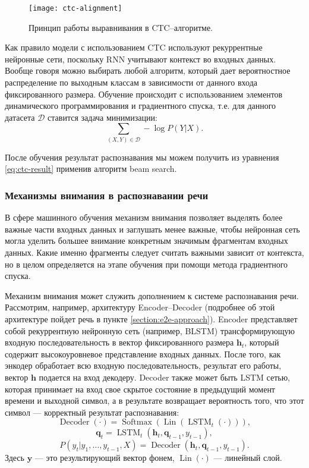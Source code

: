 \begin{figure}[h]
	\centering
	\texttt{[image: ctc-alignment]}
	\caption{Принцип работы выравнивания в CTC--алгоритме.}
	\label{fig:ctc-alignment}
\end{figure}

Как правило модели с использованием CTC используют рекуррентные нейронные сети, поскольку RNN учитывают контекст во входных данных. Вообще говоря можно выбирать любой алгоритм, который дает вероятностное распределение по выходным классам в зависимости от данного входа фиксированного размера. Обучение происходит с использованием элементов динамического программирования и градиентного спуска, т.е. для данного датасета $\mathcal{D}$ ставится задача минимизации:
$$\sum_{(X, Y) \in \mathcal{D}} - \log P(Y | X).$$

После обучения результат распознавания мы можем получить из уравнения \ref{eq:ctc-result} применив алгоритм beam search.

\subsubsection{Механизмы внимания в распознавании речи}
В сфере машинного обучения механизм внимания позволяет выделять более важные части входных данных и заглушать менее важные, чтобы нейронная сеть могла уделить большее внимание конкретным значимым фрагментам входных данных. Какие именно фрагменты следует считать важными зависит от контекста, но в целом определяется на этапе обучения при помощи метода градиентного спуска.

Механизм внимания может служить дополнением к системе распознавания речи. Рассмотрим, например, архитектуру Encoder--Decoder (подробнее об этой архитектуре пойдет речь в пункте \ref{section:e2e-approach}). Encoder представляет собой рекуррентную нейронную сеть (например, BLSTM) трансформирующую входную последовательность в вектор фиксированного размера $\mathbf{h}_t$, который содержит высокоуровневое представление входных данных. После того, как энкодер обработает всю входную последовательность, результат его работы, вектор $\mathbf{h}$ подается на вход декодеру. Decoder также может быть LSTM сетью, которая принимает на вход свое скрытое состояние в предыдущий момент времени и выходной символ, а в результате возвращает вероятность того, что этот символ --- корректный результат распознавания:
$$\operatorname{Decoder}(\cdot) = \operatorname{Softmax}(\operatorname{Lin}(\operatorname{LSTM}_t(\cdot))),$$
$$\mathbf{q}_t = \operatorname{LSTM}_t(\mathbf{h}_t, \mathbf{q}_{t - 1}, y_{t - 1}),$$
$$P(y_t|y_1, \dots, y_{t - 1}, X) = \operatorname{Decoder}(\mathbf{h}_t, \mathbf{q}_{t - 1}, y_{t - 1}).$$
Здесь $\mathbf{y}$ --- это результирующий вектор фонем, $\operatorname{Lin}(\cdot)$ --- линейный слой.

